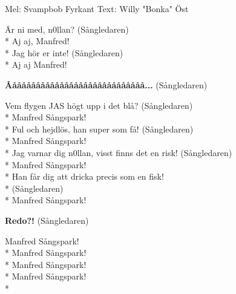 \begin{SongText}
    \begin{SongInfo}
        Mel: Svampbob Fyrkant
        Text: Willy "Bonka" Öst
    \end{SongInfo}
    \begin{SongVerse}
        Är ni med, n0llan? (Sångledaren)\\*%
        Aj aj, Manfred!\\*%
        Jag hör er inte! (Sångledaren)\\*%
        Aj aj Manfred!
    \end{SongVerse}
    \begin{SongVerse}
        \textbf{Ååååååååååååååååååååååååååååå...} (Sångledaren)
    \end{SongVerse}
    \begin{SongVerse}
        Vem flygen JAS högt upp i det blå? (Sångledaren)\\*%
        Manfred Sångspark!\\*%
        Ful och hejdlös, han super som få! (Sångledaren)\\*%
        Manfred Sångspark!\\*%
        Jag varnar dig n0llan, visst finns det en risk! (Sångledaren)\\*%
        Manfred Sångspark!\\*%
        Han får dig att dricka precis som en fisk!\\* (Sångledaren)\\*%
        Manfred Sångspark!
    \end{SongVerse}
    \begin{SongVerse}
        \textbf{Redo?!} (Sångledaren)
    \end{SongVerse}
    \begin{SongVerse}
        Manfred Sångspark!\\*%
        Manfred Sångspark!\\*%
        Manfred Sångspark!\\*%
        Manfred Sångspark!\\*%
    \end{SongVerse}
\end{SongText}
